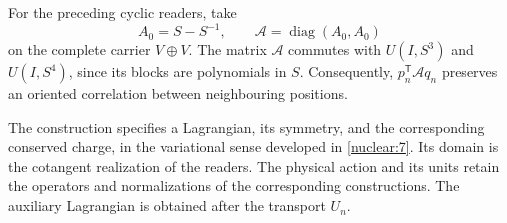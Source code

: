 For the preceding cyclic readers, take
\[
 A_0=S-S^{-1},\qquad
 \mathcal A=\operatorname{diag}(A_0,A_0)
\]
on the complete carrier \(V\oplus V\). The matrix \(\mathcal A\) commutes with \(U(I,S^3)\) and \(U(I,S^4)\), since its blocks are polynomials in \(S\). Consequently, \(p_n^{\mathsf T}\mathcal A q_n\) preserves an oriented correlation between neighbouring positions.

The construction specifies a Lagrangian, its symmetry, and the corresponding conserved charge, in the variational sense developed in \cref{nuclear:7}. Its domain is the cotangent realization of the readers. The physical action and its units retain the operators and normalizations of the corresponding constructions. The auxiliary Lagrangian is obtained after the transport \(U_n\).
